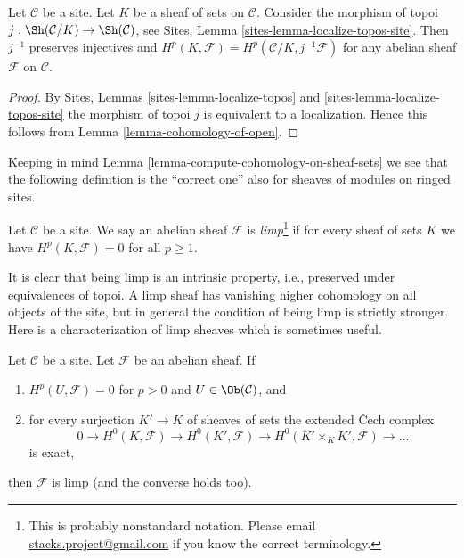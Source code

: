 \begin{lemma}
\label{lemma-cohomology-on-sheaf-sets}
Let $\mathcal{C}$ be a site. Let $K$ be a sheaf of sets on $\mathcal{C}$.
Consider the morphism of topoi
$j : \Sh(\mathcal{C}/K) \to \Sh(\mathcal{C})$, see
Sites, Lemma \ref{sites-lemma-localize-topos-site}.
Then $j^{-1}$ preserves injectives and
$H^p(K, \mathcal{F}) = H^p(\mathcal{C}/K, j^{-1}\mathcal{F})$
for any abelian sheaf $\mathcal{F}$ on $\mathcal{C}$.
\end{lemma}

\begin{proof}
By
Sites, Lemmas \ref{sites-lemma-localize-topos} and
\ref{sites-lemma-localize-topos-site}
the morphism of topoi $j$ is
equivalent to a localization. Hence this follows from
Lemma \ref{lemma-cohomology-of-open}.
\end{proof}

\noindent
Keeping in mind Lemma \ref{lemma-compute-cohomology-on-sheaf-sets}
we see that the following definition is the ``correct one'' also
for sheaves of modules on ringed sites.

\begin{definition}
\label{definition-limp}
Let $\mathcal{C}$ be a site.
We say an abelian sheaf $\mathcal{F}$ is
{\it limp}\footnote{This is probably nonstandard notation. Please email
\href{mailto:stacks.project@gmail.com}{stacks.project@gmail.com}
if you know the correct terminology.}
if for every sheaf of sets $K$ we have $H^p(K, \mathcal{F}) = 0$
for all $p \geq 1$.
\end{definition}

\noindent
It is clear that being limp is an intrinsic property, i.e.,
preserved under equivalences of topoi.
A limp sheaf has vanishing higher cohomology on all objects of the site,
but in general the condition of being limp is strictly stronger.
Here is a characterization of limp sheaves which is sometimes useful.

\begin{lemma}
\label{lemma-characterize-limp}
Let $\mathcal{C}$ be a site. Let $\mathcal{F}$ be an abelian sheaf. If
\begin{enumerate}
\item $H^p(U, \mathcal{F}) = 0$ for $p> 0$ and $U \in \Ob(\mathcal{C})$, and
\item for every surjection $K' \to K$ of sheaves of sets the
extended {\v C}ech complex
$$
0 \to H^0(K, \mathcal{F}) \to H^0(K', \mathcal{F}) \to
H^0(K' \times_K K', \mathcal{F}) \to \ldots
$$
is exact,
\end{enumerate}
then $\mathcal{F}$ is limp (and the converse holds too).
\end{lemma}

